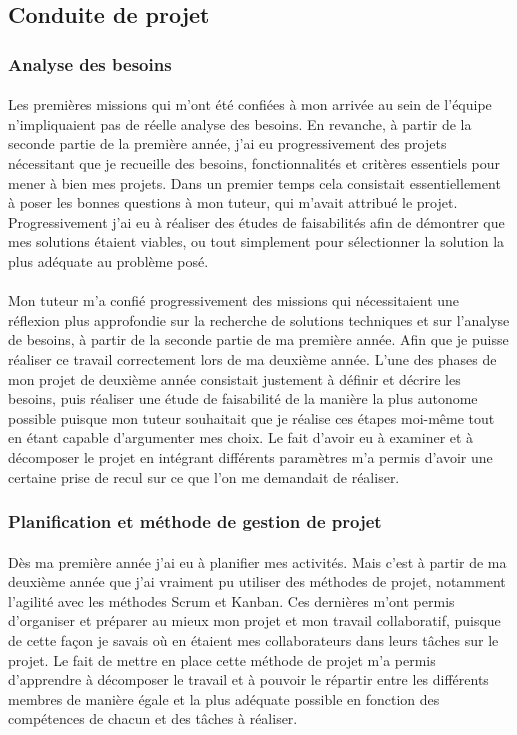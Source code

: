 \documentclass[12pt,a4paper]{report}
\begin{document}
\subsection{Conduite de projet}
\subsubsection{Analyse des besoins}
\paragraph*{}Les premières missions qui m'ont été confiées à mon arrivée au sein de l'équipe n'impliquaient pas de réelle analyse des besoins. En revanche, à partir de la seconde partie de la première année, j'ai eu progressivement des projets nécessitant que je recueille des besoins, fonctionnalités et critères essentiels pour mener à bien mes projets. Dans un premier temps cela consistait essentiellement à poser les bonnes questions à mon tuteur, qui m'avait attribué le projet. Progressivement j'ai eu à réaliser des études de faisabilités afin de démontrer que mes solutions étaient viables, ou tout simplement pour sélectionner la solution la plus adéquate au problème posé.
\paragraph*{}Mon tuteur m'a confié progressivement des missions qui nécessitaient une réflexion plus approfondie sur la recherche de solutions techniques et sur l'analyse de besoins, à partir de la seconde partie de ma première année. Afin que je puisse réaliser ce travail correctement lors de ma deuxième année. L'une des phases de mon projet de deuxième année consistait justement à définir et décrire les besoins, puis réaliser une étude de faisabilité de la manière la plus autonome possible puisque mon tuteur souhaitait que je réalise ces étapes moi-même tout en étant capable d'argumenter mes choix. Le fait d'avoir eu à examiner et à décomposer le projet en intégrant différents paramètres m'a permis d'avoir une certaine prise de recul sur ce que l'on me demandait de réaliser. \\
\subsubsection{Planification et méthode de gestion de projet}
\paragraph*{}Dès ma première année j'ai eu à planifier mes activités. Mais c'est à partir de ma deuxième année que j'ai vraiment pu utiliser des méthodes de projet, notamment l'agilité avec les méthodes Scrum et Kanban. Ces dernières m'ont permis d'organiser et préparer au mieux mon projet et mon travail collaboratif, puisque de cette façon je savais où en étaient mes collaborateurs dans leurs tâches sur le projet. Le fait de mettre en place cette méthode de projet m'a permis d'apprendre à décomposer le travail et à pouvoir le répartir entre les différents membres de manière égale et la plus adéquate possible en fonction des compétences de chacun et des tâches à réaliser.
\end{document}
